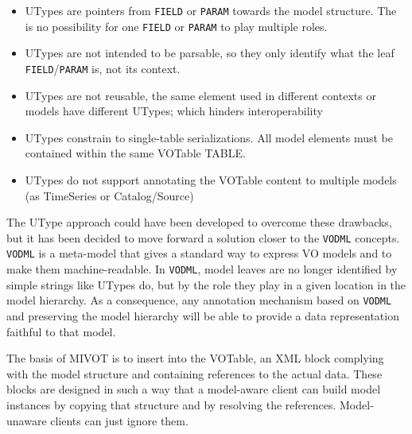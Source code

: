 \begin{itemize}
  \item UTypes are pointers from \texttt{FIELD} or \texttt{PARAM} towards the 
  model structure. The is no possibility for one  \texttt{FIELD} or
  \texttt{PARAM} to play multiple roles.
  \item UTypes are not intended to be parsable, so they only identify what the leaf 
  \texttt{FIELD}/\texttt{PARAM} is, not its context.
  \item UTypes are not reusable, the same element used in different contexts or models 
  have different UTypes; which hinders interoperability
  \item UTypes constrain to single-table serializations. All model elements must 
  be contained within the same VOTable TABLE.
  \item UTypes do not support annotating the VOTable content to multiple models 
  (as TimeSeries or Catalog/Source)
\end{itemize}

The UType approach could have been developed to overcome these drawbacks, but it has been decided to move forward a solution closer to the \texttt{VODML} \citep{2018ivoa.spec.0910L} concepts. 
 \texttt{VODML} is a meta-model that gives a standard way to express VO models and to make them machine-readable.
In \texttt{VODML},  model leaves are no longer identified by simple strings like UTypes do, but by the role they play in a given location in the model hierarchy.
As a consequence, any annotation mechanism based on \texttt{VODML} and preserving the model hierarchy will be able  to provide a data representation faithful to that model.

The basis of MIVOT is to insert into the VOTable, an XML block complying with the 
model structure and containing references to the actual data.
These blocks are designed in such a way that a model-aware client can build  model instances by copying that structure and by resolving the references. Model-unaware clients can just ignore them. 





